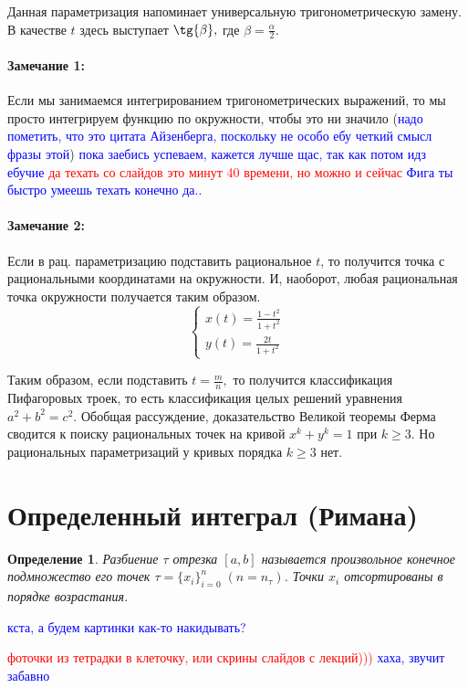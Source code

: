 \documentclass{article}
\theoremstyle{plain}
\newtheorem{definition}{Определение}
\theoremstyle{definition}
\theoremstyle{remark}
\renewcommand{\*}{\cdot}
\begin{document}
Данная параметризация напоминает универсальную тригонометрическую замену. В качестве $t$ здесь выступает $\tg{\beta},$ где $\beta = \frac{\alpha}{2}.$
\paragraph{Замечание 1:} Если мы занимаемся интегрированием тригонометрических выражений, то мы просто интегрируем функцию по окружности, чтобы это ни значило (\textcolor{blue}{надо пометить, что это цитата Айзенберга, поскольку не особо ебу четкий смысл фразы этой})
\textcolor{blue}{пока заебись успеваем, кажется лучше щас, так как потом идз ебучие}
\textcolor{red}{да техать со слайдов это минут 40 времени, но можно и сейчас}
\textcolor{blue}{Фига ты быстро умеешь техать конечно да..}


\paragraph{Замечание 2:} Если в рац. параметризацию подставить рациональное $t$, то получится точка с рациональными координатами на окружности. И, наоборот, любая рациональная точка окружности получается таким образом.
\[
\left\{
\begin{aligned}
x(t) =  \frac{1 - t^2}{1 + t^2}\\
y(t) = \frac{2t}{1 + t^2}
\end{aligned}
\right.
\]

Таким образом, если подставить $t = \frac{m}{n},$ то получится классификация Пифагоровых троек, то есть классификация целых решений уравнения $a^2 + b^2 = c^2.$ Обобщая рассуждение, доказательство Великой теоремы Ферма сводится к поиску рациональных точек на кривой $x^k + y^k = 1$ при $k \geq 3.$ Но рациональных параметризаций у кривых порядка $k \geq 3$ нет.

\section{Определенный интеграл (Римана)}


\begin{definition}
Разбиение $\tau$ отрезка $[a, b]$ называется произвольное конечное подмножество его точек $\tau = \{x_i\}_{i=0}^{n}\;(n=n_{\tau})$. Точки $x_i$ отсортированы в порядке возрастания.
\end{definition}
\textcolor{blue}{кста, а будем картинки как-то накидывать?}

\textcolor{red}{фоточки из тетрадки в клеточку, или скрины слайдов с лекций)))}
\textcolor{blue}{хаха, звучит забавно}
\end{document}

